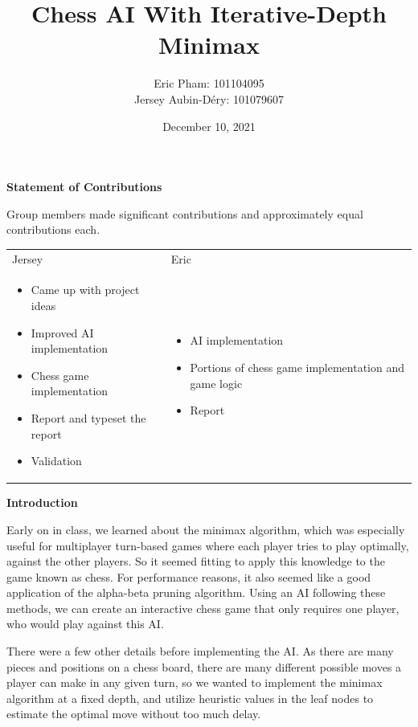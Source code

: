 \documentclass[12pt, letterpaper]{article}
\author{Eric Pham: 101104095\\Jersey Aubin-Déry: 101079607}
\date{December 10, 2021}
\title{Chess AI With Iterative-Depth Minimax\vspace{15em}}
\begin{document}
\maketitle
\thispagestyle{empty}
\clearpage

\textbf{Statement of Contributions}

\medskip

Group members made significant contributions and approximately equal contributions each.
\medskip

\begin{tabular}{m{8cm} m{8cm}}
  Jersey & Eric \\
  \begin{itemize}
    \item Came up with project ideas
    \item Improved AI implementation
    \item Chess game implementation
    \item Report and typeset the report
    \item Validation
  \end{itemize} & 
  \begin{itemize}
    \item AI implementation
    \item Portions of chess game implementation and game logic
    \item Report
  \end{itemize}
  

\end{tabular}

\textbf{Introduction}

\medskip

Early on in class, we learned about the minimax algorithm, which was especially useful for
multiplayer turn-based games where each player tries to play optimally, against the other
players. So it seemed fitting to apply this knowledge to the game known as chess. For
performance reasons, it also seemed like a good application of the alpha-beta pruning algorithm.
Using an AI following these methods, we can create an interactive chess game that only requires
one player, who would play against this AI.

\medskip

There were a few other details before implementing the AI. As there are many pieces and positions
on a chess board, there are many different possible moves a player can make in any given turn,
so we wanted to implement the minimax algorithm at a fixed depth, and utilize heuristic values
in the leaf nodes to estimate the optimal move without too much delay.
\end{document}
